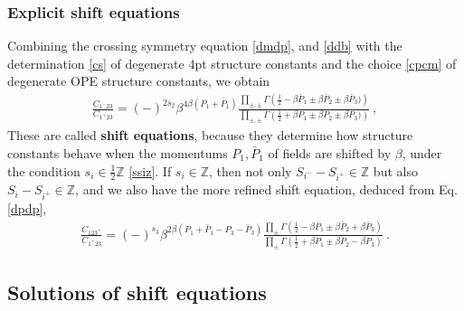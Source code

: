 \documentclass[12pt, a4paper]{article}
\theoremstyle{break}
\begin{document}
\subsubsection{Explicit shift equations}

Combining the crossing symmetry equation \eqref{dmdp}, and \eqref{ddb} with the determination \eqref{cs} of degenerate 4pt structure constants and the choice \eqref{cpcm} of degenerate OPE structure constants, we obtain
\begin{align}
 \boxed{\frac{C_{1^-23}}{C_{1^+23}} = 
 (-)^{2s_2}\beta^{4\beta (P_1+\bar P_1)} \frac{\prod_{\pm,\pm}\Gamma\left(\tfrac12 -\beta\bar P_1\pm\beta \bar P_2\pm\beta \bar P_3)\right)}{\prod_{\pm,\pm}
 \Gamma\left(\tfrac12 +\beta P_1\pm \beta P_2\pm\beta P_3)\right)}} \ ,
 \label{sh-mp}
\end{align}
These are called \textbf{shift equations}, because they determine how structure constants behave when the momentums $P_1,\bar P_1$ of fields are shifted by $\beta$, under the condition $s_i\in \frac12 \mathbb{Z}$ \eqref{ssiz}. If $s_i\in\mathbb{Z}$, then not only $S_{i^-}-S_{i^+}\in\mathbb{Z}$ but also $S_{i}-S_{i^+}\in\mathbb{Z}$, and we also have the more refined shift equation, deduced from Eq. \eqref{dpdp},
\begin{align}
 \boxed{\frac{C_{123^+}}{C_{1^+23}} = 
 (-)^{s_3} \beta^{2\beta(P_1+\bar P_1-P_3-\bar P_3)}
 \frac{ \prod_\pm\Gamma\left(\frac12 -\beta\bar P_1 \pm \beta\bar P_2 +\beta\bar P_3\right)}{ \prod_\pm\Gamma\left(\frac12+\beta P_1 \pm \beta P_2 -\beta P_3\right)}}\ .
 \label{sh-pp}
\end{align}

\subsection{Solutions of shift equations}\label{sec:essc}
\end{document}

